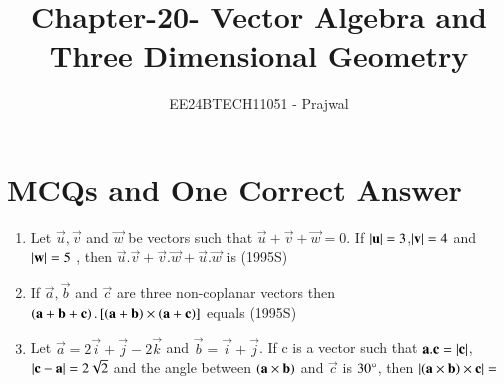 \documentclass[journal,12pt,twocolumn]{IEEEtran}
\theoremstyle{remark}
\begin{document}

\vspace{3cm}

\title{Chapter-20-
        Vector Algebra and Three Dimensional Geometry}
\author{EE24BTECH11051 - Prajwal}
\maketitle
\newpage
\bigskip

\renewcommand{\thefigure}{\theenumi}
\renewcommand{\thetable}{\theenumi}


\section{MCQs and One Correct Answer}
   


\begin{enumerate}
  \item Let $\vec{u},\vec{v}$ and $\vec{w}$ be vectors such that $\vec{u}+\vec{v}+\vec{w} = 0$. If $\left\vert\mathbf{u}\right\vert=3$,$\left\vert\mathbf{v}\right\vert=4$ and $\left\vert\mathbf{w}\right\vert=5$ , then $\vec{u}.\vec{v}+\vec{v}.\vec{w}+\vec{u}.\vec{w}$ is
  \hfill (1995S)
 \begin{enumerate}
 \end{enumerate}   	
  \item If $\vec{a},\vec{b}$ and $\vec{c}$ are three non-coplanar vectors then 
  $\left(\mathbf{a}+\mathbf{b}+\mathbf{c}\right).{}\left[\left(\mathbf{a}+\mathbf{b}\right) \times \left(\mathbf{a}+\mathbf{c}\right)\right]$ equals
  \hfill (1995S)
  \begin{enumerate}
  \end{enumerate}
\item Let $\vec{a}=2\vec{i}+\vec{j}-2\vec{k}$ and $\vec{b}=\vec{i}+\vec{j}$. If c is  a vector such that $\mathbf{a}.\mathbf{c}=\left\vert\mathbf{c}\right\vert$,$\left\vert\mathbf{c}-\mathbf{a}\right\vert=2\sqrt{2}$ and the angle between $\left(\mathbf{a} \times \mathbf{b}\right)$ and $\vec{c}$ is $30\degree$, then $\left\vert\left(\mathbf{a} \times \mathbf{b}\right) \times \mathbf{c}\right\vert = $  

\end{enumerate}
\end{document}
